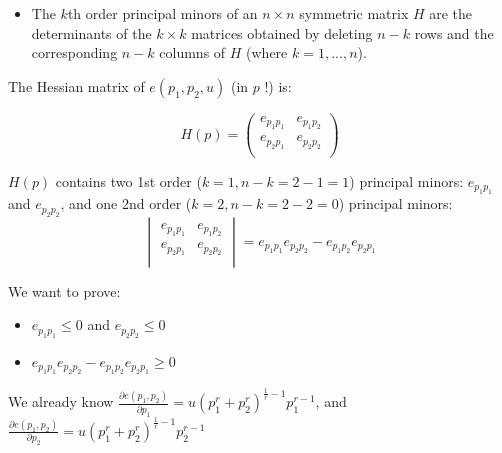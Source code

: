 \documentclass{article}
\begin{document}
\begin{mdframed}[backgroundcolor=blue!20,linecolor=white]
\begin{itemize}
\item The $k$th order principal minors of an $n \times n$ symmetric matrix $H$ are the determinants of the $k \times k$ matrices obtained by deleting $n − k$ rows and the corresponding $n − k$ columns of $H$ (where $k = 1, ..., n$).

\end{itemize}

\vspace{2mm}

The Hessian matrix of $e(p_1,p_2,u)$ (in $p$ !) is:

\vspace{2mm}

\begin{equation}
H(p)=\left(
    \begin{array}{cc}
		e_{p_1p_1} & e_{p_1p_2}  \\
		e_{p_2p_1} & e_{p_2p_2}  \\
    \end{array}
    \right) 
\label{eq:hessian_e}   
\end{equation}

\vspace{2mm}

$H(p)$ contains two 1st order ($k = 1, n - k = 2 -1 = 1$) principal minors: $e_{p_1p_1}$ and $e_{p_2p_2}$, and one 2nd order ($k = 2, n - k = 2 -2 = 0$) principal minors:
\begin{equation}
    \begin{vmatrix}
		e_{p_1p_1} & e_{p_1p_2}  \\
		e_{p_2p_1} & e_{p_2p_2}  \\
    \end{vmatrix}
=e_{p_1p_1}e_{p_2p_2} - e_{p_1p_2}e_{p_2p_1}
\label{eq:pminor_e}   
\end{equation}

We want to prove:

\begin{itemize}
\item  $e_{p_1p_1} \le 0$  and $e_{p_2p_2} \le 0$
\item  $e_{p_1p_1}e_{p_2p_2} - e_{p_1p_2}e_{p_2p_1} \ge 0$

\end{itemize}
\end{mdframed}

\vspace{2mm}


We already know $\frac{\partial e(p_1,p_2)}{\partial p_1} =
u (p_1^{r} + p_2^{r})^{\frac{1}{r} - 1} p_1^{r-1}$, and 
$\frac{\partial e(p_1,p_2)}{\partial p_2} = 
u (p_1^{r} + p_2^{r})^{\frac{1}{r} - 1} p_2^{r-1}$
\end{document}
